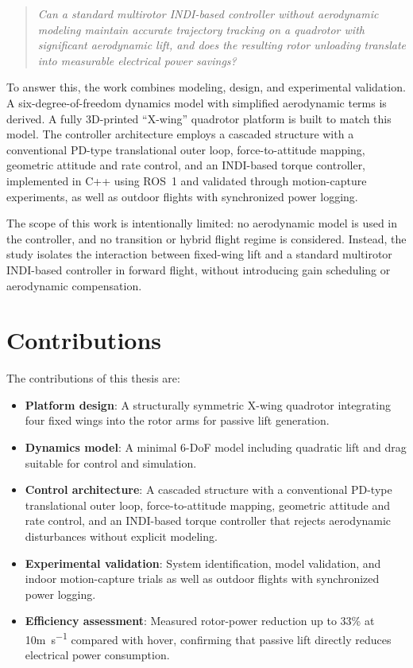 \begin{quote}
\textit{Can a standard multirotor INDI-based controller without aerodynamic modeling maintain accurate trajectory tracking on a quadrotor with significant aerodynamic lift, and does the resulting rotor unloading translate into measurable electrical power savings?}
\end{quote}

To answer this, the work combines modeling, design, and experimental validation. A six-degree-of-freedom dynamics model with simplified aerodynamic terms is derived. A fully 3D-printed ``X-wing'' quadrotor platform is built to match this model. The controller architecture employs a cascaded structure with a conventional PD-type translational outer loop, force-to-attitude mapping, geometric attitude and rate control, and an INDI-based torque controller, implemented in C++ using ROS~1 and validated through motion-capture experiments, as well as outdoor flights with synchronized power logging.

The scope of this work is intentionally limited: no aerodynamic model is used in the controller, and no transition or hybrid flight regime is considered. Instead, the study isolates the interaction between fixed-wing lift and a standard multirotor INDI-based controller in forward flight, without introducing gain scheduling or aerodynamic compensation.

\section{Contributions}
The contributions of this thesis are:

\begin{itemize}
  \item \textbf{Platform design}: A structurally symmetric X-wing quadrotor integrating four fixed wings into the rotor arms for passive lift generation.
  
  \item \textbf{Dynamics model}: A minimal 6-DoF model including quadratic lift and drag suitable for control and simulation.
  
  \item \textbf{Control architecture}: A cascaded structure with a conventional PD-type translational outer loop, force-to-attitude mapping, geometric attitude and rate control, and an INDI-based torque controller that rejects aerodynamic disturbances without explicit modeling.
  
  \item \textbf{Experimental validation}: System identification, model validation, and indoor motion-capture trials as well as outdoor flights with synchronized power logging.
  
  \item \textbf{Efficiency assessment}: Measured rotor-power reduction up to 33\% at 10\si{\meter\per\second} compared with hover, confirming that passive lift directly reduces electrical power consumption.
\end{itemize}

